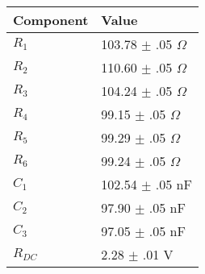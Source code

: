 \begin{tabular}{ll}
Component & Value                     \\ \hline
$R_1$     & 103.78 $\pm$ .05 $\Omega$ \\
$R_2$     & 110.60 $\pm$ .05 $\Omega$ \\
$R_3$     & 104.24 $\pm$ .05 $\Omega$ \\
$R_4$     & 99.15 $\pm$ .05 $\Omega$  \\
$R_5$     & 99.29 $\pm$ .05 $\Omega$  \\
$R_6$     & 99.24 $\pm$ .05 $\Omega$  \\
$C_1$     & 102.54 $\pm$ .05 nF       \\
$C_2$     & 97.90 $\pm$ .05 nF        \\
$C_3$     & 97.05 $\pm$ .05 nF        \\
$R_{DC}$     & 2.28 $\pm$ .01 V       \\
\end{tabular}